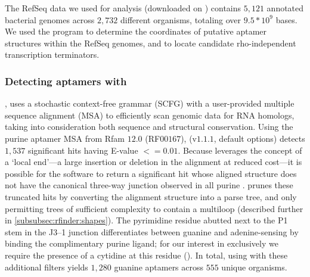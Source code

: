 The RefSeq data we used for analysis (downloaded on \fnaRetrievalTime)
contains $5,121$ annotated bacterial genomes
across $2,732$ different organisms, totaling over $9.5 * 10^9$ bases. We used the
program \infernal to determine the coordinates of putative aptamer structures
within the RefSeq genomes, and \tthp to locate candidate rho-independent
transcription terminators.

\subsubsection{Detecting aptamers with \infernal}
\label{subsubsec:rfinder:infernal}

\infernal \citep{infernal}, \citep{nawrocki:2013hk} uses a stochastic context-free
grammar (SCFG) with a user-provided multiple sequence alignment (MSA) to
efficiently scan genomic data for RNA homologs, taking into consideration both
sequence and structural conservation. Using the purine aptamer MSA from Rfam $12.0$
(RF$00167$), \infernal (v$1.1.1$, default options) detects $1,537$ significant hits
having E-value $<= 0.01$. Because \infernal leverages the concept of a
`local end'---a large insertion or deletion in the alignment at reduced cost---it
is possible for the software to return a significant hit whose aligned structure
does not have the canonical three-way junction observed in all purine
\rbs. \rfinder prunes these truncated \infernal hits by converting the
alignment structure into a parse tree, and only permitting trees of sufficient
complexity to contain a multiloop (described further in
\ref{subsubsec:rfinder:shapes}). The pyrimidine residue abutted next to the P1
stem in the J3--1 junction differentiates between guanine and adenine-sensing
\rbs by binding the complimentary purine ligand; for our interest in \grbs
exclusively we require the presence of a cytidine at this residue
(). In total, using
\infernal with these additional filters yields $1,280$ guanine aptamers across $555$
unique organisms.

